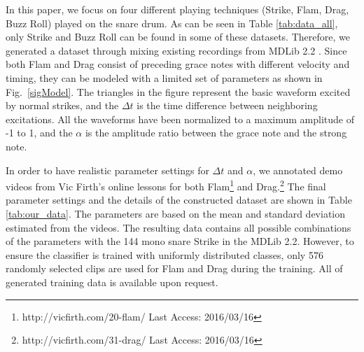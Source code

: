 \documentclass{article}
\begin{document}
In this paper, we focus on four different playing techniques (Strike, Flam, Drag, Buzz Roll) played on the snare drum. As can be seen in Table \ref{tab:data_all}, only Strike and Buzz Roll can be found in some of these datasets. Therefore, we generated a dataset through mixing existing recordings from MDLib 2.2 \cite{Prockup2013}. Since both Flam and Drag consist of preceding grace notes with different velocity and timing, they can be modeled with a limited set of parameters as shown in Fig.~\ref{sigModel}. The triangles in the figure represent the basic waveform excited by normal strikes, and the $\Delta t$ is the time difference between neighboring excitations. All the waveforms have been normalized to a maximum amplitude of -1 to 1, and the $\alpha$ is the amplitude ratio between the grace note and the strong note. 

In order to have realistic parameter settings for $\Delta t$ and $\alpha$, we annotated demo videos from Vic Firth's online lessons for both Flam\footnote{http://vicfirth.com/20-flam/ Last Access: 2016/03/16} and Drag.\footnote{http://vicfirth.com/31-drag/ Last Access: 2016/03/16} The final parameter settings and the details of the constructed dataset are shown in Table \ref{tab:our_data}. The parameters are based on the mean and standard deviation estimated from the videos. The resulting data contains all possible combinations of the parameters with the 144 mono snare Strike in the MDLib 2.2. However, to ensure the classifier is trained with uniformly distributed classes, only 576 randomly selected clips are used for Flam and Drag during the training. All of generated training data is available upon request.
\end{document}
